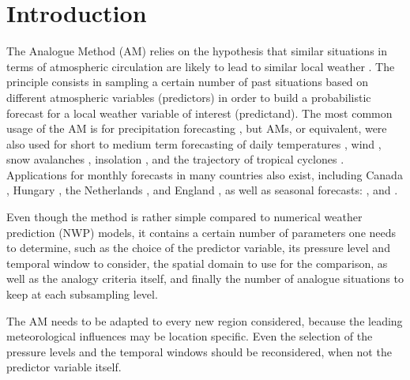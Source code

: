 \documentclass{ametsoc}
\begin{document}


\section{Introduction}
\label{section_intro}

The Analogue Method (AM) relies on the hypothesis that similar situations in terms of atmospheric circulation are likely to lead to similar local weather \citep{Lorenz1956, Lorenz1969, Duband1970, Bontron2005}. The principle consists in sampling a certain number of past situations based on different atmospheric variables (predictors) in order to build a probabilistic forecast for a local weather variable of interest (predictand). The most common usage of the AM is for precipitation forecasting \citep[eg.][]{Guilbaud1997, Bontron2005, Bliefernicht2010, Marty2012, Horton2012, Radanovics2013, BenDaoud2015}, but AMs, or equivalent, were also used for short to medium term forecasting of daily temperatures \citep{Radinovic1975, Woodcock1980, Kruizinga1983}, wind \citep{Gordon1987}, snow avalanches \citep{Obled1980, Bolognesi1993}, insolation \citep{Bois1981}, and the trajectory of tropical cyclones \citep{Keenan1981, Sievers2000, Fraedrich2003}. Applications for monthly forecasts in many countries also exist, including Canada \citep{Shabbar1986},  Hungary \citep{Toth1989}, the Netherlands \citep{Nap1981}, and England \citep{Murray1974}, as well as seasonal forecasts: \citet{Barnett1978}, \citet{Bergen1982} and \citet{Livezey1988}.

Even though the method is rather simple compared to numerical weather prediction (NWP) models, it contains a certain number of parameters one needs to determine, such as the choice of the predictor variable, its pressure level and temporal window to consider, the spatial domain to use for the comparison, as well as the analogy criteria itself, and finally the number of analogue situations to keep at each subsampling level. 

The AM needs to be adapted to every new region considered, because the leading meteorological influences may be location specific. Even the selection of the pressure levels and the temporal windows should be reconsidered, when not the predictor variable itself. 
\end{document}
